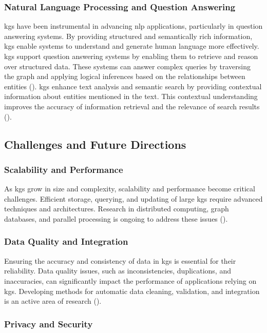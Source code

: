 \subsubsection*{Natural Language Processing and Question Answering}
\glspl{kg} have been instrumental in advancing \gls{nlp} applications, particularly in question answering systems. By providing structured and semantically rich information, \glspl{kg} enable systems to understand and generate human language more effectively.
\glspl{kg} support question answering systems by enabling them to retrieve and reason over structured data.
These systems can answer complex queries by traversing the graph and applying logical inferences based on the relationships between entities (\cite{Yasunaga2021}).
\glspl{kg} enhance text analysis and semantic search by providing contextual information about entities mentioned in the text.
This contextual understanding improves the accuracy of information retrieval and the relevance of search results (\cite{Fernandez2011}).

\subsection*{Challenges and Future Directions}

\subsubsection*{Scalability and Performance}
As \glspl{kg} grow in size and complexity, scalability and performance become critical challenges. Efficient storage, querying, and updating of large \glspl{kg} require advanced techniques and architectures. Research in distributed computing, graph databases, and parallel processing is ongoing to address these issues (\cite{Chaudhri2022}).
 
\subsubsection*{Data Quality and Integration}

Ensuring the accuracy and consistency of data in \glspl{kg} is essential for their reliability. Data quality issues, such as inconsistencies, duplications, and inaccuracies, can significantly impact the performance of applications relying on \glspl{kg}. Developing methods for automatic data cleaning, validation, and integration is an active area of research (\cite{Paulheim2017}).

\subsubsection*{Privacy and Security}

